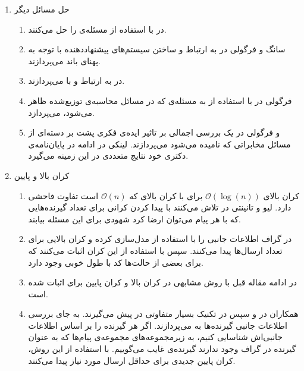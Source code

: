 \begin{enumerate}
\begin{enumerate}
 	\end{enumerate}
 	\item حل مسائل دیگر
 	\begin{enumerate}
 		\item 
 		در
 		\cite{Obead_2023}
 		با استفاده از  
 		\picod
 		مسئله‌ی
 		را حل می‌کنند.
 		\item
 		سانگ و فرگولی در
 		\cite{8404065}
 		به ارتباط 
 		\picod
 		و ساختن سیستم‌های پیشنهاددهنده‌ با توجه به پهنای باند می‌پردازند.
 		\item
 		در
 		\cite{e24081149}
 		به ارتباط 
 		\icod
 		و
 		\picod
 		با
 		می‌پردازند.
 		\item 
 		فرگولی در
 		\cite{datashuf}
 		با استفاده از
 		\picod
 		به مسئله‌ی
 		که در مسائل محاسبه‌ی توزیع‌شده ظاهر می‌شود، می‌پردازد.
 		\item
 		و فرگولی در
 		\cite{7176784}
 		یک بررسی‌ اجمالی بر تاثیر ایده‌ی فکری پشت
 		\picod
 		بر دسته‌ای از مسائل مخابراتی که
 		نامیده می‌شود می‌پردازند. لینکی در ادامه در پایان‌نامه‌ی دکتری خود
 		\cite{linqiphd}
 		نتایج متعددی در این زمینه می‌گیرد.
 	\end{enumerate}
 	\item کران بالا و پایین
 	\begin{enumerate}
 		\item 
 		کران بالای
 		$\mathcal{O}(\log(n))$
 		برای
 		\picod
 		با کران بالای
 		\icod
 		که
 		$\mathcal{O}(n)$
 		است تفاوت فاحشی دارد. لیو و تانینتی در
 		\cite{7606849}
 		تلاش می‌کنند با پیدا کردن کرانی برای تعداد گیرنده‌هایی که با هر پیام می‌توان ارضا کرد شهودی برای این مسئله بیابند.
 		\item 
 		در
 		\cite{9518120}
 		گراف اطلاعات جانبی را با استفاده از 
 		مدل‌سازی کرده و کران بالایی برای تعداد ارسال‌ها پیدا می‌کنند. سپس با استفاده از این کران اثبات می‌کنند که برای بعضی از حالت‌ها کد با طول خوبی وجود دارد.
 		\item
 		در ادامه مقاله قبل با روش مشابهی در
 		\cite{9965883}
 		کران بالا و کران پایین برای
 		\picod
 		اثبات شده است.
 		\item
 		همکاران در
 		\cite{ong2019improved}
 		و سپس در
 		\cite{8849527}
 		تکنیک بسیار متفاوتی در پیش می‌گیرند. به جای بررسی اطلاعات جانبی گیرنده‌ها به 
 		می‌پردازند. اگر هر گیرنده را بر اساس اطلاعات جانبی‌اش شناسایی کنیم، به زیرمجموعه‌های مجموعه‌ی پیام‌ها که به عنوان گیرنده در گراف وجود ندارند گیرنده‌ی غایب می‌گوییم. با استفاده از این روش، کران پایین جدیدی برای حداقل ارسال مورد نیاز پیدا می‌کنند.
 	\end{enumerate}
 \end{enumerate}
 
